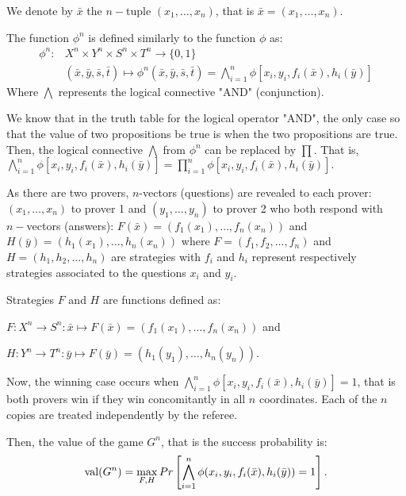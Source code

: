We denote by  $\bar{x}$ the $n-$tuple $(x_1,\ldots, x_n)$, that is $\bar{x}=(x_1,\ldots, x_n)$. 

The function $\phi^n$ is defined similarly to the function $ \phi$ as:
\begin{align*}
\phi^n: & X^n \times Y^n \times S^n \times T^n  \longrightarrow  \{0,1\}\\ 
& (\bar{x}, \bar{y},\bar{s}, \bar{t})  \longmapsto  \phi^n(\bar{x}, \bar{y},\bar{s}, \bar{t}) = \bigwedge\limits_{i=1}^n \phi [x_i,y_i, f_i(\bar{x}), h_i(\bar{y})]
\end{align*}
Where $\bigwedge$ represents the logical connective "AND" (conjunction).

We know that in the truth table for the logical operator "AND", the only case so that the value of two propositions be true is when the two propositions are true. Then, the logical connective $\bigwedge$ from $\phi^n$ can be replaced by $\prod.$ That is,  $\bigwedge\limits_{i=1}^n \phi [x_i,y_i, f_i(\bar{x}), h_i(\bar{y})]=\prod\limits_{i=1}^n  \phi [x_i,y_i, f_i(\bar{x}), h_i(\bar{y})].$

As there are two provers, $n$-vectors (questions) are revealed to each prover:  $(x_1, \ldots , x_n)$ to prover 1 and  $(y_1, \ldots , y_n)$ to prover 2 who both respond with $n-$vectors (answers): $F(\bar{x})=(f_1(x_1), \ldots , f_n(x_n))$ and $H(\bar{y})=(h_1(x_1), \ldots , h_n(x_n))$ where $F=(f_1, f_2, \ldots, f_n)$ and $H=(h_1, h_2, \ldots, h_n)$ are strategies with $f_i$ and $h_i$ represent respectively strategies associated to the questions $x_i$ and $y_i.$

Strategies $F$ and $H$ are functions defined as:

 $F: X^n \longrightarrow S^n: \bar{x} \longmapsto F(\bar{x})=(f_1(x_1), \ldots , f_n(x_n))$ and 
 
 $H: Y^n \longrightarrow T^n: \bar{y} \longmapsto F(\bar{y})=(h_1(y_1), \ldots , h_n(y_n))$.

Now, the winning case occurs when ${\bigwedge\limits_{i=1}^n \phi [x_i,y_i, f_i(\bar{x}), h_i(\bar{y})]=1}$, that is both provers win if they win concomitantly in all $n$ coordinates. Each of the $n$ copies are treated independently by the referee.

Then, the value of the game $G^n$, that is the success probability is: $$\mathrm{val} (G^n) =\max_{F,H}Pr \left[\bigwedge\limits_{i=1}^n \phi (x_i,y_i, f_i(\bar{x}), h_i(\bar{y}))=1 \right].$$


